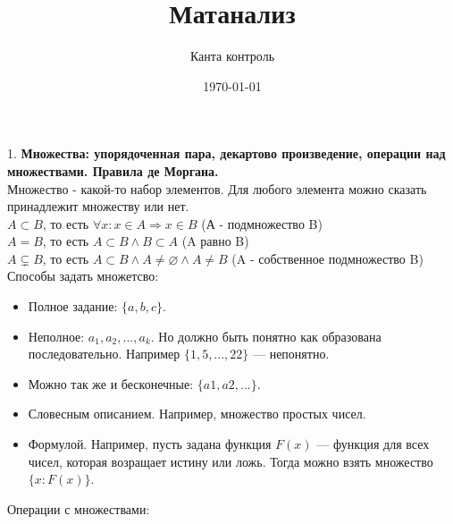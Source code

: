 \documentclass[12pt]{article}
\title{Матанализ}
\author{Канта контроль}
\date{\today}
\begin{document}
\maketitle
\large

1. \textbf{Множества: упорядоченная пара, декартово произведение, операции над множествами. Правила де Моргана.}\\
Множество - какой-то набор элементов. Для любого элемента можно сказать принадлежит множеству или нет.\\
$A \subset B$, то есть $\forall x : x \in A \Rightarrow x \in B$ (А - подмножество B)\\
$A = B$, то есть $A \subset B \wedge B \subset A$ (A равно B)\\
$A \subsetneq B$, то есть $A \subset B \wedge A \ne \varnothing \wedge A \ne B$ (A - собственное подмножество B)\\
Способы задать множетсво:
\begin{itemize}
    \item Полное задание: $\{a,b,c\}$.
    \item Неполное: $a_1, a_2, ..., a_k$. Но должно быть понятно как образована последовательно. Например $\{1,5,...,22\}$ — непонятно.
    \item Можно так же и бесконечные: $\{a1, a2, ...\}$.
    \item Словесным описанием. Например, множество простых чисел.
    \item Формулой. Например, пусть задана функция $F(x)$ — функция для всех чисел, которая возращает истину или ложь. Тогда можно взять множество $\{x : F(x)\}$.
\end{itemize}
Операции с множествами:\\
\end{document}
